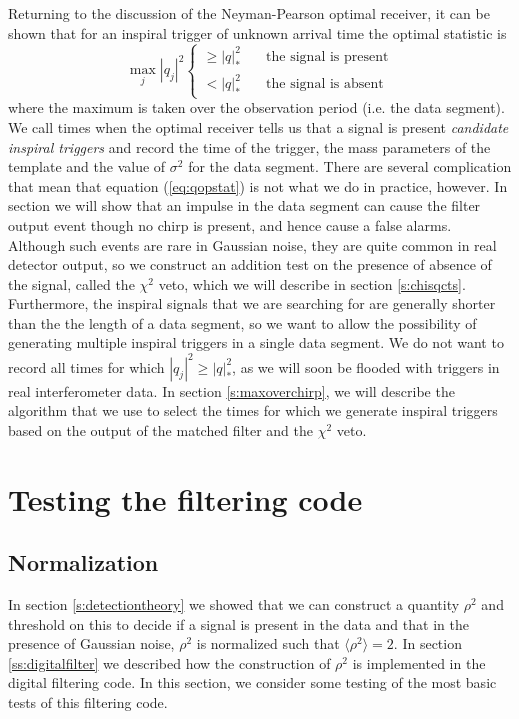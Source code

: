 Returning to the discussion of the Neyman-Pearson optimal receiver, it can be
shown that for an inspiral trigger of unknown arrival time the optimal
statistic is\cite{Finn:1992wt}
\begin{equation}
\max_{j} |q_j|^2 
\begin{cases}
\ge |q|^2_\ast &\quad \text{the signal is present}\\
< |q|^2_\ast &\quad \text{the signal is absent}
\end{cases}
\label{eq:qopstat}
\end{equation}
where the maximum is taken over the observation period (i.e. the data
segment).  We call times when the optimal receiver tells us that a signal is
present \emph{candidate inspiral triggers} and record the time of the trigger,
the mass parameters of the template and the value of $\sigma^2$ for the data
segment. There are several complication that mean that equation
(\ref{eq:qopstat}) is not what we do in practice, however. In section
\label{ss:impulsetime} we will show that an impulse in the data segment can
cause the filter output event though no chirp is present, and hence cause a
false alarms. Although such events are rare in Gaussian noise, they are quite
common in real detector output, so we construct an addition test on the
presence of absence of the signal, called the $\chi^2$ veto\cite{Allen:2004},
which we will describe in section \ref{s:chisqcts}. Furthermore, the inspiral
signals that we are searching for are generally shorter than the the length of
a data segment, so we want to allow the possibility of generating multiple
inspiral triggers in a single data segment. We do not want to record all times
for which $|q_j|^2 \ge |q|^2_\ast$, as we will soon be flooded with triggers
in real interferometer data. In section \ref{s:maxoverchirp}, we will describe
the algorithm that we use to select the times for which we generate inspiral
triggers based on the output of the matched filter and the $\chi^2$ veto.

\section{Testing the filtering code}
\label{s:testing}

\subsection{Normalization}
\label{ss:normalization}

In section \ref{s:detectiontheory} we showed that we can construct a quantity
$\rho^2$ and threshold on this to decide if a signal is present in the data
and that in the presence of Gaussian noise, $\rho^2$ is normalized such that 
$\langle\rho^2\rangle = 2$.  In section \ref{ss:digitalfilter} we described
how the construction of $\rho^2$ is implemented in the digital filtering code.
In this section, we consider some testing of the most basic tests of this
filtering code.

